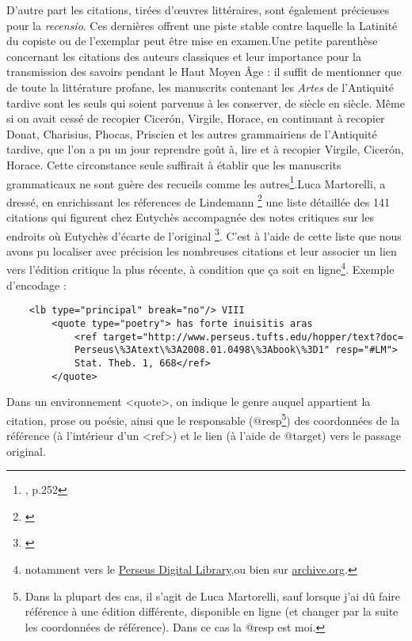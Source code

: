 \documentclass[a4paper, twoside, 12pt]{book}
\begin{document}
D'autre part les citations, tirées d'œuvres littéraires, sont également précieuses pour la \textit{recensio}. Ces dernières offrent une piste stable contre laquelle la \og{} Latinité \fg{} du copiste ou de l'exemplar peut être mise en examen.Une petite parenthèse concernant les citations des auteurs classiques et leur importance pour la transmission des savoirs pendant le Haut Moyen Âge : il suffit de mentionner que de toute la littérature profane, les manuscrits contenant les \textit{Artes} de l'Antiquité tardive sont les seuls qui soient parvenus à les conserver, de siècle en siècle. Même si on avait cessé de recopier Cicerón, Virgile, Horace, en continuant à recopier Donat, Charisius, Phocas, Priscien et les autres grammairiens de l'Antiquité tardive, que l'on a pu un jour reprendre goût à, lire et à recopier Virgile, Cicerón, Horace. Cette circonstance seule suffirait à établir que les manuscrits grammaticaux ne sont guère des recueils comme les autres\footnote{\cite{holtz1978typologie}, p.252}.Luca Martorelli, a dressé, en enrichissant les réferences de Lindemann \footnote{\cite{lindemann1833corpus}} une liste détaillée des 141 citations qui figurent chez Eutychès accompagnée des notes critiques sur les endroits où Eutychès d'écarte de l'original \footnote{\cite{martorelli2017citazioni}}.  C'est à l'aide de cette liste que nous avons pu localiser avec précision les nombreuses citations et leur associer un lien vers l'édition critique la plus récente, à condition que ça soit en ligne\footnote{notamment vers le {\href{http://www.perseus.tufts.edu/hopper/}{Perseus Digital Library}},ou bien sur {\href{https://archive.org/}{archive.org}}.}. Exemple d'encodage : \\

\begin{verbatim}
    <lb type="principal" break="no"/> VIII 
        <quote type="poetry"> has forte inuisitis aras
            <ref target="http://www.perseus.tufts.edu/hopper/text?doc=
            Perseus\%3Atext\%3A2008.01.0498\%3Abook\%3D1" resp="#LM"> 
            Stat. Theb. 1, 668</ref>
        </quote>
\end{verbatim}


Dans un environnement <quote>, on indique le genre auquel appartient la citation, prose ou poésie, ainsi que le responsable (@resp\footnote{Dans la plupart des cas, il s'agit de Luca Martorelli, sauf lorsque j'ai dû faire référence à une édition différente, disponible en ligne (et changer par la suite les coordonnées de référence). Dans ce cas la @resp est moi.}) des coordonnées de la référence (à l'intérieur d'un <ref>) et le lien (à l'aide de @target) vers le passage original.
\end{document}
